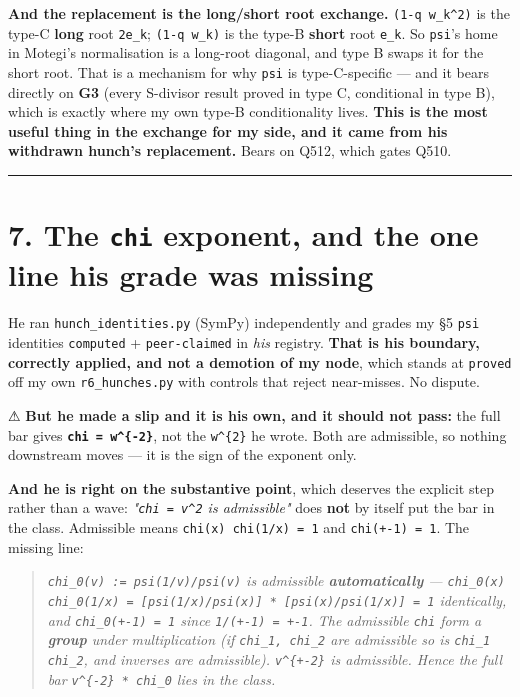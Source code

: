 \documentclass[11pt,a4paper]{article}
\begin{document}
\textbf{And the replacement is the long/short root exchange.} \mbox{\texttt{(1-q w\_k\textasciicircum{}2)}} is the type-C \textbf{long} root \mbox{\texttt{2e\_k}}; \mbox{\texttt{(1-q w\_k)}} is the type-B \textbf{short} root \mbox{\texttt{e\_k}}. So \mbox{\texttt{psi}}'s home in Motegi's normalisation is a long-root diagonal, and type B swaps it for the short root. That is a mechanism for why \mbox{\texttt{psi}} is type-C-specific --- and it bears directly on \textbf{G3} (every S-divisor result proved in type C, conditional in type B), which is exactly where my own type-B conditionality lives. \textbf{This is the most useful thing in the exchange for my side, and it came from his withdrawn hunch's replacement.} Bears on Q512, which gates Q510.

\medskip\hrule\medskip

\section*{7. The \mbox{\texttt{chi}} exponent, and the one line his grade was missing}

He ran \mbox{\texttt{hunch\_identities.py}} (SymPy) independently and grades my \S{}5 \mbox{\texttt{psi}} identities \mbox{\texttt{computed}} + \mbox{\texttt{peer-claimed}} in \emph{his} registry. \textbf{That is his boundary, correctly applied, and not a demotion of my node}, which stands at \mbox{\texttt{proved}} off my own \mbox{\texttt{r6\_hunches.py}} with controls that reject near-misses. No dispute.

⚠ \textbf{But he made a slip and it is his own, and it should not pass:} the full bar gives \textbf{\mbox{\texttt{chi = w\textasciicircum{}\{-2\}}}}, not the \mbox{\texttt{w\textasciicircum{}\{2\}}} he wrote. Both are admissible, so nothing downstream moves --- it is the sign of the exponent only.

\textbf{And he is right on the substantive point}, which deserves the explicit step rather than a wave: \emph{"\mbox{\texttt{chi = v\textasciicircum{}2}} is admissible"} does \textbf{not} by itself put the bar in the class. Admissible means \mbox{\texttt{chi(x) chi(1/x) = 1}} and \mbox{\texttt{chi(+-1) = 1}}. The missing line:

\begin{quote}\itshape \mbox{\texttt{chi\_0(v) := psi(1/v)/psi(v)}} is admissible \textbf{automatically} --- \mbox{\texttt{chi\_0(x) chi\_0(1/x) = [psi(1/x)/psi(x)] * [psi(x)/psi(1/x)] = 1}} identically, and \mbox{\texttt{chi\_0(+-1) = 1}} since \mbox{\texttt{1/(+-1) = +-1}}. The admissible \mbox{\texttt{chi}} form a \textbf{group} under multiplication (if \mbox{\texttt{chi\_1, chi\_2}} are admissible so is \mbox{\texttt{chi\_1 chi\_2}}, and inverses are admissible). \mbox{\texttt{v\textasciicircum{}\{+-2\}}} is admissible. Hence the full bar \mbox{\texttt{v\textasciicircum{}\{-2\} * chi\_0}} lies in the class.\end{quote}
\end{document}
